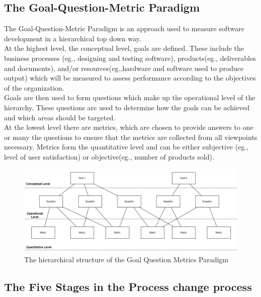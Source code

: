 \documentclass{article}
\begin{document}
   \subsection{The Goal-Question-Metric Paradigm }
   The Goal-Question-Metric Paradigm is an approach used to measure software development in a hierarchical top down way.\\  
   At the highest level, the conceptual level, goals are defined. These include the business processes (eg., designing and testing software), products(eg., deliverables and documents), and/or resources(eg.,hardware and software used to produce output) which will be measured to assess performance according to the objectives of the organization.\cite{yahya2015using} \\
   Goals are then used to form questions which make up the operational level of the hierarchy.  These questions are used to determine how the goals can be achieved and which areas should be targeted. \\
   At the lowest level there are metrics, which are chosen to provide answers to one or many the questions to ensure that the metrics are collected from all viewpoints necessary. Metrics form the quantitative level and can be either subjective (eg., level of user satisfaction) or objective(eg., number of products sold). \cite{berander2006goal}\\
   \begin{figure}[ht!]
   	\includegraphics[width =1.2\textwidth, right]{images/GQM.png}
   	\caption{The hierarchical structure of the Goal Question Metrics Paradigm \cite{caldiera1994goal}}
   \end{figure}
   \newpage
   \subsection{The Five Stages in the Process change process}
   
\end{document}
